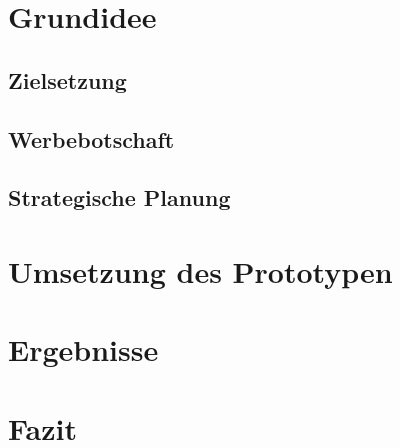 







\tableofcontents


\clearpage
\section{Grundidee}

\subsection{Zielsetzung}
\subsection{Werbebotschaft}
\subsection{Strategische Planung}


\clearpage
\section{Umsetzung des Prototypen}










\clearpage
\section{Ergebnisse}


\clearpage

\clearpage

\clearpage
\section{Fazit}



